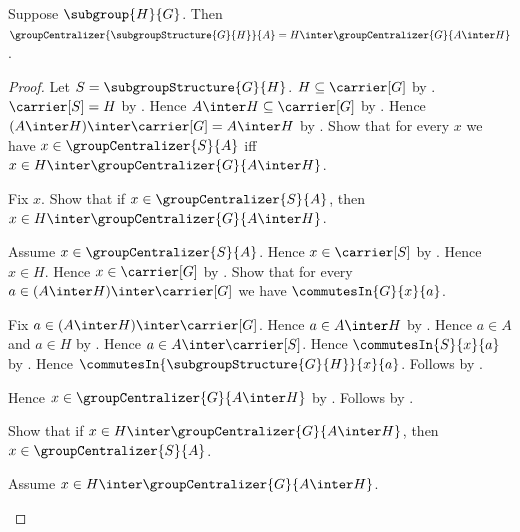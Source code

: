 \begin{theorem}\label{subgroup_structure_centralizer}
    Suppose $\subgroup{H}{G}$.
    Then
        $\groupCentralizer{\subgroupStructure{G}{H}}{A}=
            H\inter\groupCentralizer{G}{A\inter H}$.
\end{theorem}
\begin{proof}
    Let $S=\subgroupStructure{G}{H}$.
    $H\subseteq\carrier[G]$ by .
    $\carrier[S]=H$ by .
    Hence $A\inter H\subseteq\carrier[G]$ by
        .
    Hence $(A\inter H)\inter\carrier[G]=A\inter H$ by
        .
    Show that for every $x$ we have
        $x\in\groupCentralizer{S}{A}$ iff
        $x\in H\inter\groupCentralizer{G}{A\inter H}$.
    \begin{subproof}
        Fix $x$.
        Show that if $x\in\groupCentralizer{S}{A}$, then
            $x\in H\inter\groupCentralizer{G}{A\inter H}$.
        \begin{subproof}
            Assume $x\in\groupCentralizer{S}{A}$.
            Hence $x\in\carrier[S]$ by
                .
            Hence $x\in H$.
            Hence $x\in\carrier[G]$ by
                .
            Show that for every
                $a\in(A\inter H)\inter\carrier[G]$ we have
                $\commutesIn{G}{x}{a}$.
            \begin{subproof}
                Fix $a\in(A\inter H)\inter\carrier[G]$.
                Hence $a\in A\inter H$ by .
                Hence $a\in A$ and $a\in H$ by
                    .
                Hence $a\in A\inter\carrier[S]$.
                Hence $\commutesIn{S}{x}{a}$ by
                    .
                Hence
                    $\commutesIn{\subgroupStructure{G}{H}}{x}{a}$.
                Follows by
                    .
            \end{subproof}
            Hence $x\in\groupCentralizer{G}{A\inter H}$ by
                .
            Follows by .
        \end{subproof}
        Show that if
            $x\in H\inter\groupCentralizer{G}{A\inter H}$, then
            $x\in\groupCentralizer{S}{A}$.
        \begin{subproof}
            Assume
                $x\in H\inter\groupCentralizer{G}{A\inter H}$.

\end{subproof}
\end{subproof}
\end{proof}
